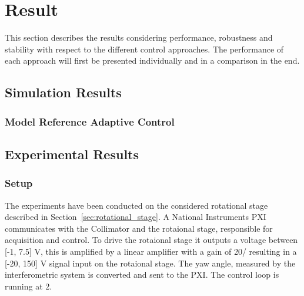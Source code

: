 \chapter{Result}\label{cha:result}
This section describes the results considering performance, robustness and stability with respect to the different control approaches. The performance of each approach will first be presented individually and in a comparison in the end.


\section{Simulation Results}
\subsection{Model Reference Adaptive Control}




\section{Experimental Results}
\subsection{Setup}
The experiments have been conducted on the considered rotational stage described in Section~\ref{sec:rotational_stage}. A National Instruments PXI communicates with the Collimator and the rotaional stage, responsible for acquisition and control. To drive the rotaional stage it outputs a voltage between [-1, 7.5] V, this is amplified by a linear amplifier with a gain of \unit{20}{\volt/\volt} resulting in a [-20, 150] V signal input on the rotaional stage. The yaw angle, measured by the interferometric system is converted and sent to the PXI. The control loop is running at \unit{2}{\kilo\hertz}.
